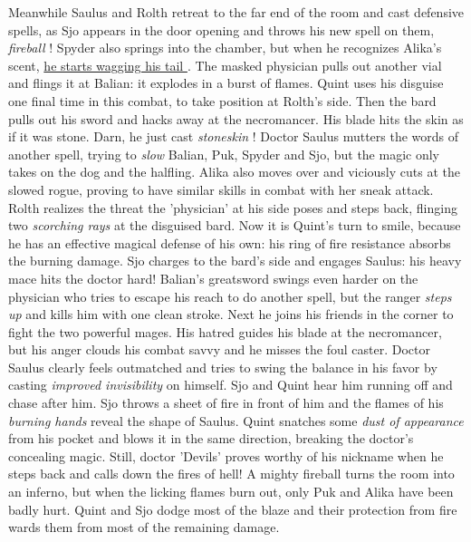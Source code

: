 Meanwhile Saulus and Rolth retreat to the far end of the room and cast defensive spells, as Sjo appears in the door opening and throws his new spell on them, {\itshape fireball} ! Spyder also springs into the chamber, but when he recognizes Alika's scent, \hyperref[fig:Spyder-recognizes-Balian-s-sister-Alika-520054718]{ he starts wagging his tail } . The masked physician pulls out another vial and flings it at Balian: it explodes in a burst of flames. Quint uses his disguise one final time in this combat, to take position at Rolth's side. Then the bard pulls out his sword and hacks away at the necromancer. His blade hits the skin as if it was stone. Darn, he just cast  {\itshape stoneskin} ! Doctor Saulus mutters the words of another spell, trying to  {\itshape slow} Balian, Puk, Spyder and Sjo, but the magic only takes on the dog and the halfling. Alika also moves over and viciously cuts at the slowed rogue, proving to have similar skills in combat with her sneak attack. Rolth realizes the threat the 'physician' at his side poses and steps back, flinging two  {\itshape scorching rays} at the disguised bard. Now it is Quint's turn to smile, because he has an effective magical defense of his own: his ring of fire resistance absorbs the burning damage. Sjo charges to the bard's side and engages Saulus: his heavy mace hits the doctor hard! Balian's greatsword swings even harder on the physician who tries to escape his reach to do another spell, but the ranger  {\itshape steps up} and kills him with one clean stroke. Next he joins his friends in the corner to fight the two powerful mages. His hatred guides his blade at the necromancer, but his anger clouds his combat savvy and he misses the foul caster. Doctor Saulus clearly feels outmatched and tries to swing the balance in his favor by casting  {\itshape improved invisibility} on himself. Sjo and Quint hear him running off and chase after him. Sjo throws a sheet of fire in front of him and the flames of his  {\itshape burning hands} reveal the shape of Saulus. Quint snatches some  {\itshape dust of appearance} from his pocket and blows it in the same direction, breaking the doctor's concealing magic. Still, doctor 'Devils' proves worthy of his nickname when he steps back and calls down the fires of hell! A mighty fireball turns the room into an inferno, but when the licking flames burn out, only Puk and Alika have been badly hurt. Quint and Sjo dodge most of the blaze and their protection from fire wards them from most of the remaining damage. \\

